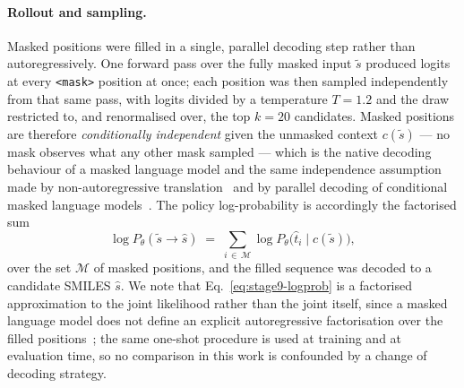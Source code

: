 \paragraph{Rollout and sampling.}
Masked positions were filled in a single, parallel decoding step rather than
autoregressively. One forward pass over the fully masked input $\tilde{s}$
produced logits at every \texttt{<mask>} position at once; each position was
then sampled independently from that same pass, with logits divided by a
temperature $T=1.2$ and the draw restricted to, and renormalised over, the
top $k=20$ candidates. Masked positions are therefore \emph{conditionally
independent} given the unmasked context $c(\tilde{s})$ --- no mask observes
what any other mask sampled --- which is the native decoding behaviour of a
masked language model and the same independence assumption made by
non-autoregressive translation~\cite{gu2018nat} and by parallel decoding of
conditional masked language models~\cite{ghazvininejad2019maskpredict}. The
policy log-probability is accordingly the factorised sum
\begin{equation}
\log P_{\theta}(\tilde{s} \to \hat{s}) \;=\; \sum_{i \,\in\, \mathcal{M}} \log P_{\theta}\bigl(\hat{t}_i \mid c(\tilde{s})\bigr),
\label{eq:stage9-logprob}
\end{equation}
over the set $\mathcal{M}$ of masked positions, and the filled sequence was
decoded to a candidate SMILES $\hat{s}$. We note that
Eq.~\eqref{eq:stage9-logprob} is a factorised approximation to the joint
likelihood rather than the joint itself, since a masked language model does
not define an explicit autoregressive factorisation over the filled
positions~\cite{wang2019bertmouth}; the same one-shot procedure is used at
training and at evaluation time, so no comparison in this work is confounded
by a change of decoding strategy.

